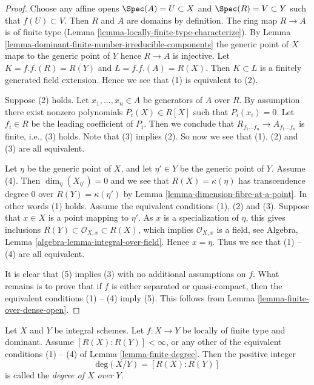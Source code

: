 \begin{proof}
Choose any affine opens $\Spec(A) = U \subset X$
and $\Spec(R) = V \subset Y$ such that $f(U) \subset V$.
Then $R$ and $A$ are domains by definition. The ring map
$R \to A$ is of finite type
(Lemma \ref{lemma-locally-finite-type-characterize}).
By Lemma \ref{lemma-dominant-finite-number-irreducible-components}
the generic point of $X$ maps to the generic point of $Y$
hence $R \to A$ is injective.
Let $K = f.f.(R) = R(Y)$ and $L = f.f.(A) = R(X)$. Then $K \subset L$
is a finitely generated field extension. Hence we see that
(1) is equivalent to (2).

\medskip\noindent
Suppose (2) holds. Let $x_1, \ldots, x_n \in A$ be generators
of $A$ over $R$. By assumption there exist nonzero polynomials
$P_i(X) \in R[X]$ such that $P_i(x_i) = 0$. Let $f_i \in R$ be the
leading coefficient of $P_i$. Then we conclude that
$R_{f_1 \ldots f_n} \to A_{f_1 \ldots f_n}$ is finite, i.e., (3) holds.
Note that (3) implies (2). So now we see that (1), (2) and (3) are all
equivalent.

\medskip\noindent
Let $\eta$ be the generic point of $X$, and let $\eta' \in Y$ be the
generic point of $Y$. Assume (4). Then
$\dim_\eta(X_{\eta'}) = 0$ and we see that $R(X) = \kappa(\eta)$ has
transcendence degree $0$ over $R(Y) = \kappa(\eta')$ by
Lemma \ref{lemma-dimension-fibre-at-a-point}.
In other words (1) holds. Assume the equivalent conditions (1), (2) and
(3). Suppose that $x \in X$ is a point mapping to $\eta'$.
As $x$ is a specialization of $\eta$,
this gives inclusions $R(Y) \subset \mathcal{O}_{X, x} \subset R(X)$,
which implies $\mathcal{O}_{X, x}$ is a field, see
Algebra, Lemma \ref{algebra-lemma-integral-over-field}.
Hence $x = \eta$. Thus we see that (1) -- (4)
are all equivalent.

\medskip\noindent
It is clear that (5) implies (3) with no additional assumptions on
$f$. What remains is to prove that if $f$ is either separated or
quasi-compact, then the equivalent conditions (1) -- (4) imply (5).
This follows from Lemma \ref{lemma-finite-over-dense-open}.
\end{proof}

\begin{definition}
\label{definition-degree}
Let $X$ and $Y$ be integral schemes.
Let $f : X \to Y$ be locally of finite type and dominant.
Assume $[R(X) : R(Y)] < \infty$, or any other of the equivalent
conditions (1) -- (4) of Lemma \ref{lemma-finite-degree}.
Then the positive integer
$$
\text{deg}(X/Y) = [R(X) : R(Y)]
$$
is called the {\it degree of $X$ over $Y$}.
\end{definition}

